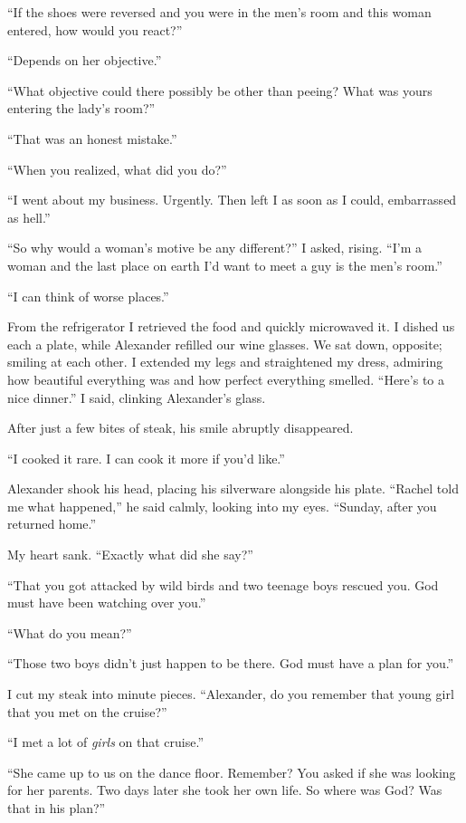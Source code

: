``If the shoes were reversed and you were in the men's room and this
woman entered, how would you react?''

``Depends on her objective.''

``What objective could there possibly be other than peeing? What was
yours entering the lady's room?''

``That was an honest mistake.''

``When you realized, what did you do?''

``I went about my business. Urgently. Then left I as soon as I could,
embarrassed as hell.''

``So why would a woman's motive be any different?'' I asked, rising.
``I'm a woman and the last place on earth I'd want to meet a guy is the
men's room.''

``I can think of worse places.''

From the refrigerator I retrieved the food and quickly microwaved it. I
dished us each a plate, while Alexander refilled our wine glasses. We
sat down, opposite; smiling at each other. I extended my legs and
straightened my dress, admiring how beautiful everything was and how
perfect everything smelled. ``Here's to a nice dinner.'' I said,
clinking Alexander's glass.

After just a few bites of steak, his smile abruptly disappeared.

``I cooked it rare. I can cook it more if you'd like.''

Alexander shook his head, placing his silverware alongside his plate.
``Rachel told me what happened,'' he said calmly, looking into my eyes.
``Sunday, after you returned home.''

My heart sank. ``Exactly what did she say?''

``That you got attacked by wild birds and two teenage boys rescued you.
God must have been watching over you.''

``What do you mean?''

``Those two boys didn't just happen to be there. God must have a plan
for you.''

I cut my steak into minute pieces. ``Alexander, do you remember that
young girl that you met on the cruise?''

``I met a lot of \emph{girls} on that cruise.''

``She came up to us on the dance floor. Remember? You asked if she was
looking for her parents. Two days later she took her own life. So where
was God? Was that in his plan?''

